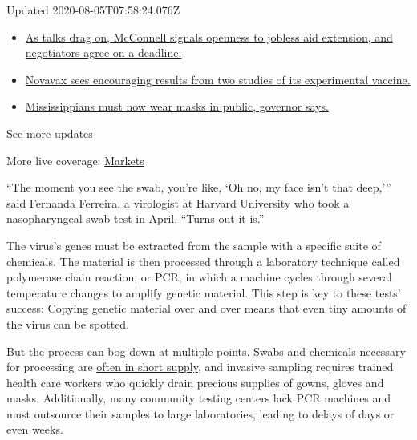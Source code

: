Updated 2020-08-05T07:58:24.076Z

\begin{itemize}
\tightlist
\item
  \href{https://www.nytimes3xbfgragh.onion/2020/08/04/world/coronavirus-cases.html?action=click\&pgtype=Article\&state=default\&region=MAIN_CONTENT_1\&context=storylines_live_updates\#link-762df92}{As
  talks drag on, McConnell signals openness to jobless aid extension,
  and negotiators agree on a deadline.}
\item
  \href{https://www.nytimes3xbfgragh.onion/2020/08/04/world/coronavirus-cases.html?action=click\&pgtype=Article\&state=default\&region=MAIN_CONTENT_1\&context=storylines_live_updates\#link-1228a480}{Novavax
  sees encouraging results from two studies of its experimental
  vaccine.}
\item
  \href{https://www.nytimes3xbfgragh.onion/2020/08/04/world/coronavirus-cases.html?action=click\&pgtype=Article\&state=default\&region=MAIN_CONTENT_1\&context=storylines_live_updates\#link-794484ed}{Mississippians
  must now wear masks in public, governor says.}
\end{itemize}

\href{https://www.nytimes3xbfgragh.onion/2020/08/04/world/coronavirus-cases.html?action=click\&pgtype=Article\&state=default\&region=MAIN_CONTENT_1\&context=storylines_live_updates}{See
more updates}

More live coverage:
\href{https://www.nytimes3xbfgragh.onion/live/2020/08/04/business/stock-market-today-coronavirus?action=click\&pgtype=Article\&state=default\&region=MAIN_CONTENT_1\&context=storylines_live_updates}{Markets}

``The moment you see the swab, you're like, `Oh no, my face isn't that
deep,''' said Fernanda Ferreira, a virologist at Harvard University who
took a nasopharyngeal swab test in April. ``Turns out it is.''

The virus's genes must be extracted from the sample with a specific
suite of chemicals. The material is then processed through a laboratory
technique called polymerase chain reaction, or PCR, in which a machine
cycles through several temperature changes to amplify genetic material.
This step is key to these tests' success: Copying genetic material over
and over means that even tiny amounts of the virus can be spotted.

But the process can bog down at multiple points. Swabs and chemicals
necessary for processing are
\href{https://www.nytimes3xbfgragh.onion/2020/03/18/health/coronavirus-test-shortages-face-masks-swabs.html}{often
in short supply}, and invasive sampling requires trained health care
workers who quickly drain precious supplies of gowns, gloves and masks.
Additionally, many community testing centers lack PCR machines and must
outsource their samples to large laboratories, leading to delays of days
or even weeks.

